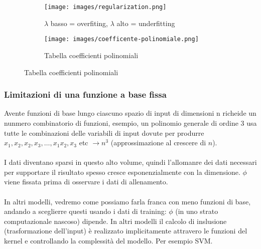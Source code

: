\begin{figure}[h!]
        \centering
    \begin{subfigure}{.42\textwidth}
        \texttt{[image: images/regularization.png]}
        \caption{$\lambda$ basso = overfiting, $\lambda$ alto = underfitting}
    \end{subfigure}
    \begin{subfigure}{.42\textwidth}
        \texttt{[image: images/coefficente-polinomiale.png]}
        \caption{Tabella coefficienti polinomiali}
    \end{subfigure}
\end{figure}
\subsubsection{Limitazioni di una funzione a base fissa}
Avente funzioni di base lungo ciascuno spazio di input di dimensioni n richeide un nunmero combinatorio di funzioni, 
esempio, un polinomio generale di ordine 3 usa tutte le combinazioni delle variabili di input dovute per produrre 
$x_1, x_2, x_2, x_3, \dots, x_1x_2,x_3$ etc $\to n^3$ (approssimazione al crescere di $n$).\\\\
I dati diventano sparsi in questo alto volume, quindi l'allomanre dei dati necessari per supportare il risultato
spesso cresce esponenzialmente con la dimensione. $\phi$ viene fissata prima di osservare i dati di allenamento. \\\\
In altri modelli, vedremo come possiamo farla franca con meno funzioni di base, andando a sceglierre questi usando i dati di training:
$\phi$ (in uno strato computazionale nascoso) dipende. In altri modelli il calcolo di inslusione (trasformazione dell'input)
è realizzato implicitamente attravero le funzioni del kernel e controllando la complessità del modello. Per esempio SVM.

